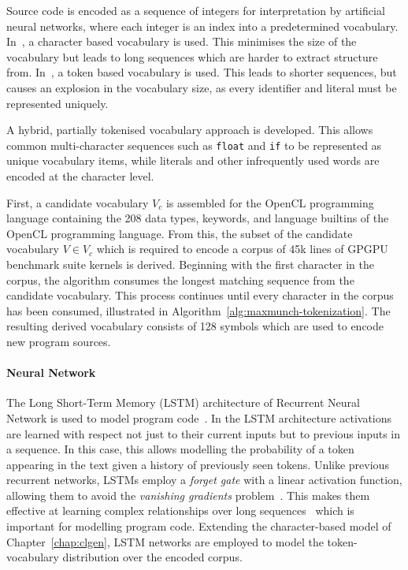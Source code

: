 Source code is encoded as a sequence of integers for interpretation by artificial neural networks, where each integer is an index into a predetermined vocabulary. In~\cite{Jozefowicz2016a}, a character based vocabulary is used. This minimises the size of the vocabulary but leads to long sequences which are harder to extract structure from. In~\cite{Allamanis2013a}, a token based vocabulary is used. This leads to shorter sequences, but causes an explosion in the vocabulary size, as every identifier and literal must be represented uniquely.

A hybrid, partially tokenised vocabulary approach is developed. This allows common multi-character sequences such as \texttt{float} and \texttt{if} to be represented as unique vocabulary items, while literals and other infrequently used words are encoded at the character level.

First, a candidate vocabulary $V_c$ is assembled for the OpenCL programming language containing the 208 data types, keywords, and language builtins of the OpenCL programming language. From this, the subset of the candidate vocabulary $V \in V_c$ which is required to encode a corpus of 45k lines of GPGPU benchmark suite kernels is derived. Beginning with the first character in the corpus, the algorithm consumes the longest matching sequence from the candidate vocabulary. This process continues until every character in the corpus has been consumed, illustrated in Algorithm~\ref{alg:maxmunch-tokenization}. The resulting derived vocabulary consists of 128 symbols which are used to encode new program sources.

\begin{algorithm}
  
  \caption[Deriving a vocabulary from a string]{%
    Deriving a hybrid token- and character-level vocabulary from a string.%
  }
  \label{alg:maxmunch-tokenization}
\end{algorithm}


\paragraph*{Neural Network}

The Long Short-Term Memory (LSTM) architecture of Recurrent Neural Network is used to model program code~\cite{Hochreiter1997}. In the LSTM architecture activations are learned with respect not just to their current inputs but to previous inputs in a sequence. In this case, this allows modelling the probability of a token appearing in the text given a history of previously seen tokens. Unlike previous recurrent networks, LSTMs employ a \emph{forget gate} with a linear activation function, allowing them to avoid the \emph{vanishing gradients} problem~\cite{Pacanu2013}. This makes them effective at learning complex relationships over long sequences~\cite{Lipton2015} which is important for modelling program code. Extending the character-based model of Chapter~\ref{chap:clgen}, LSTM networks are employed to model the token-vocabulary distribution over the encoded corpus.

